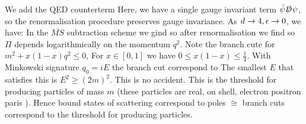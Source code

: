 \documentclass{article}
\begin{document}
We add the QED counterterm 
Here, we have a single gauge invariant term $\bar{\psi} \slashed{D} \psi$, so the renormalisation procedure preserves gauge invariance. As $d\to 4, \epsilon \to 0 $, we have: 
In the $\overline{MS}$ subtraction scheme we gind 
so after renormalisation we find 
so $\Pi$ depends logarithmically on the momentum $q^2$. Note the branch cute for $m^2 + x(1-x)q^2 \leq 0$, For $x \in [0,1]$ we have $0 \leq x(1-x) \leq \frac{1}{4}$. With Minkowski signature $q_0 = iE$ the branch cut correspond to 
The smallest $E$ that satisfies this is $E^2 \geq (2m)^2 $. This is no accident. This is the threshold for producing particles of mass $m$ (these particles are real, on shell, electron positron paris ). Hence bound states of scattering correspond to poles $\cong$ branch cuts correspond to the threshold for producing particles. 

\end{document}

